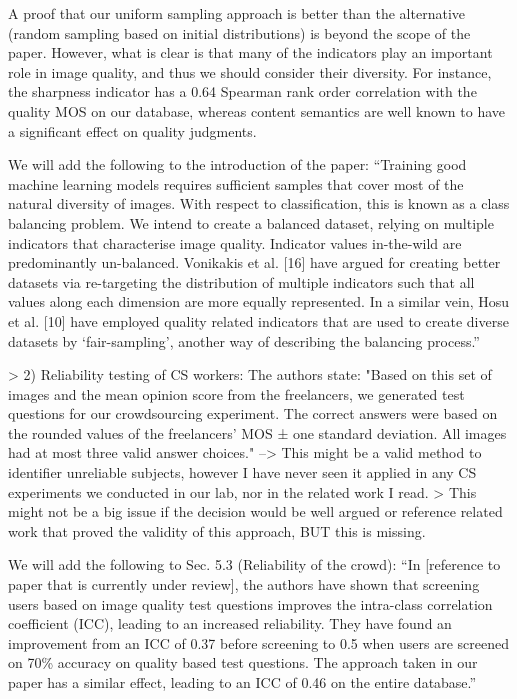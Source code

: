 \documentclass{article}
\begin{document}
A proof that our uniform sampling approach is better than the alternative (random sampling based on initial distributions) is beyond the scope of the paper. However, what is clear is that many of the indicators play an important role in image quality, and thus we should consider their diversity. For instance, the sharpness indicator has a 0.64 Spearman rank order correlation with the quality MOS on our database, whereas content semantics are well known to have a significant effect on quality judgments.

We will add the following to the introduction of the paper:
“Training good machine learning models requires sufficient samples that cover most of the natural diversity of images. With respect to classification, this is known as a class balancing problem. We intend to create a balanced dataset, relying on multiple indicators that characterise image quality. Indicator values in-the-wild are predominantly un-balanced. Vonikakis et al. [16] have argued for creating better datasets via re-targeting the distribution of multiple indicators such that all values along each dimension are more equally represented. In a similar vein, Hosu et al. [10] have employed quality related indicators that are used to create diverse datasets by ‘fair-sampling’, another way of describing the balancing process.”

> 2) Reliability testing of CS workers: The authors state: "Based on this set of images and the mean opinion score from the freelancers, we generated test questions for our crowdsourcing experiment. The correct answers were based on the rounded values of the freelancers’ MOS ± one standard deviation. All images had at most three valid answer choices." --> This might be a valid method to identifier unreliable subjects, however I have never seen it applied in any CS experiments we conducted in our lab, nor in the related work I read. 
> This might not be a big issue if the decision would be well argued or reference related work that proved the validity of this approach, BUT this is missing.

We will add the following to Sec. 5.3 (Reliability of the crowd):
“In [reference to paper that is currently under review], the authors have shown that screening users based on image quality test questions improves the intra-class correlation coefficient (ICC), leading to an increased reliability. They have found an improvement from an ICC of 0.37 before screening to 0.5 when users are screened on 70\% accuracy on quality based test questions. The approach taken in our paper has a similar effect, leading to an ICC of 0.46 on the entire database.”
\end{document}
